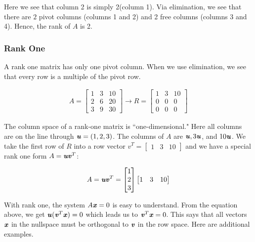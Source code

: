 \documentclass[12pt, letterpaper]{article}
\newcommand{\V}[1]{\textbf{\textit{#1}}}
\begin{document}
		Here we see that column 2 is simply 2(column 1). Via elimination, we see that there are $2$ pivot columns (columns 1 and 2) and 2 free columns (columns 3 and 4). Hence, the rank of $A$ is 2.
		
\subsubsection{Rank One}
	A rank one matrix has only one pivot column. When we use elimination, we see that every row is a multiple of the pivot row.
	
	\begin{gather*}
			A = \begin{bmatrix}
					1 & 3 & 10 \\
					2 & 6 & 20 \\
					3 & 9 & 30
					\end{bmatrix} \rightarrow R = \begin{bmatrix}
														1 & 3 & 10 \\
														0 & 0 & 0 \\
														0 & 0 & 0
														\end{bmatrix}
	\end{gather*}
	
	The column space of a rank-one matrix is ``one-dimensional." Here all columns are on the line through $\V{u}=(1,2,3)$. The columns of $A$ are $\V{u}, 3\V{u}$, and $10\V{u}$. We take the first row of $R$ into a row vector $v^T = \begin{bmatrix} 1 & 3 & 10 \end{bmatrix}$ and we have a special rank one form $A=\V{uv}^T$:
				
				\begin{gather*}
					A = \V{uv}^T = \begin{bmatrix} 1 \\ 2 \\ 3 \end{bmatrix} \begin{bmatrix} 1 & 3 & 10 \end{bmatrix}
				\end{gather*}
				
	With rank one, the system $A\V{x} = 0$ is easy to understand. From the equation above, we get $\V{u}(\V{v}^T \V{x})=0$ which leads us to $\V{v}^T \V{x} = 0$. This says that all vectors $\V{x}$ in the nullspace must be orthogonal to $\V{v}$ in the row space. Here are additional examples.
	
\end{document}
